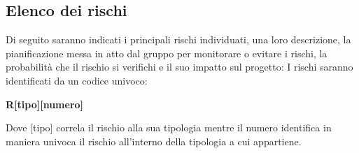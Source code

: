 \documentclass[../piano-di-progetto.tex]{subfiles}
\begin{document}
  \subsection{Elenco dei rischi}%
  \label{sub:elenco_dei_rischi}
  Di seguito saranno indicati i principali rischi individuati, una loro descrizione, la pianificazione messa in atto dal gruppo per monitorare o evitare i rischi, la probabilità che il rischio si verifichi e il suo impatto sul progetto:
  I rischi saranno identificati da un codice univoco:
  \begin{center}
    \textbf{R[tipo][numero]}
  \end{center}
  Dove [tipo] correla il rischio alla sua tipologia mentre il numero identifica in maniera univoca il rischio all'interno della tipologia a cui appartiene.
      \renewcommand{\arraystretch}{2} %
\end{document}
